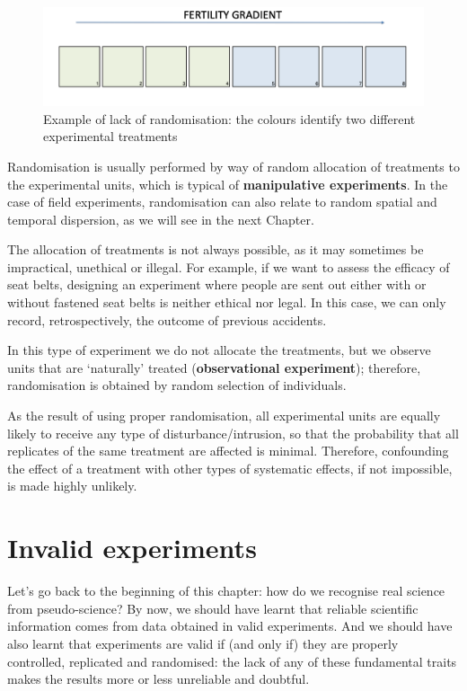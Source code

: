 \documentclass[a4paper,12pt,oneside]{book}
\begin{document}
\begin{figure}

{\centering \includegraphics[width=1.05\linewidth]{_images/LackRandomisation} 

}

\caption{Example of lack of randomisation: the colours identify two different experimental treatments}\label{fig:figName2c}
\end{figure}

Randomisation is usually performed by way of random allocation of treatments to the experimental units, which is typical of \textbf{manipulative experiments}. In the case of field experiments, randomisation can also relate to random spatial and temporal dispersion, as we will see in the next Chapter.

The allocation of treatments is not always possible, as it may sometimes be impractical, unethical or illegal. For example, if we want to assess the efficacy of seat belts, designing an experiment where people are sent out either with or without fastened seat belts is neither ethical nor legal. In this case, we can only record, retrospectively, the outcome of previous accidents.

In this type of experiment we do not allocate the treatments, but we observe units that are `naturally' treated (\textbf{observational experiment}); therefore, randomisation is obtained by random selection of individuals.

As the result of using proper randomisation, all experimental units are equally likely to receive any type of disturbance/intrusion, so that the probability that all replicates of the same treatment are affected is minimal. Therefore, confounding the effect of a treatment with other types of systematic effects, if not impossible, is made highly unlikely.

\hypertarget{invalid-experiments}{%
\section{Invalid experiments}\label{invalid-experiments}}

Let's go back to the beginning of this chapter: how do we recognise real science from pseudo-science? By now, we should have learnt that reliable scientific information comes from data obtained in valid experiments. And we should have also learnt that experiments are valid if (and only if) they are properly controlled, replicated and randomised: the lack of any of these fundamental traits makes the results more or less unreliable and doubtful.
\end{document}
